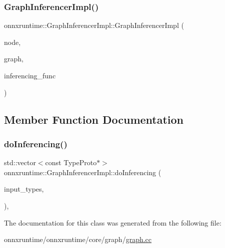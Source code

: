 \subsubsection{\texorpdfstring{Graph\+Inferencer\+Impl()}{GraphInferencerImpl()}}
{\footnotesize\ttfamily onnxruntime\+::\+Graph\+Inferencer\+Impl\+::\+Graph\+Inferencer\+Impl (\begin{DoxyParamCaption}\item[{const \mbox{\hyperlink{classonnxruntime_1_1Node}{Node}} \&}]{node,  }\item[{\mbox{\hyperlink{classonnxruntime_1_1Graph}{Graph}} \&}]{graph,  }\item[{\mbox{\hyperlink{namespaceonnxruntime_ae184f68a858158d9595f3fe260b05dfb}{Subgraph\+Inferencing\+Func}} \&}]{inferencing\+\_\+func }\end{DoxyParamCaption})\hspace{0.3cm}{\ttfamily [inline]}}



\subsection{Member Function Documentation}
\mbox{\label{classonnxruntime_1_1GraphInferencerImpl_adb5d5e5f020c9881069b645dffe9a719}} 
\subsubsection{\texorpdfstring{do\+Inferencing()}{doInferencing()}}
{\footnotesize\ttfamily std\+::vector$<$const Type\+Proto$\ast$$>$ onnxruntime\+::\+Graph\+Inferencer\+Impl\+::do\+Inferencing (\begin{DoxyParamCaption}\item[{const std\+::vector$<$ const Type\+Proto $\ast$$>$ \&}]{input\+\_\+types,  }\item[{const std\+::vector$<$ const Tensor\+Proto $\ast$$>$ \&}]{ }\end{DoxyParamCaption})\hspace{0.3cm}{\ttfamily [inline]}, {\ttfamily [override]}}



The documentation for this class was generated from the following file\+:\begin{DoxyCompactItemize}
\item 
onnxruntime/onnxruntime/core/graph/\mbox{\hyperlink{graph_8cc}{graph.\+cc}}\end{DoxyCompactItemize}
